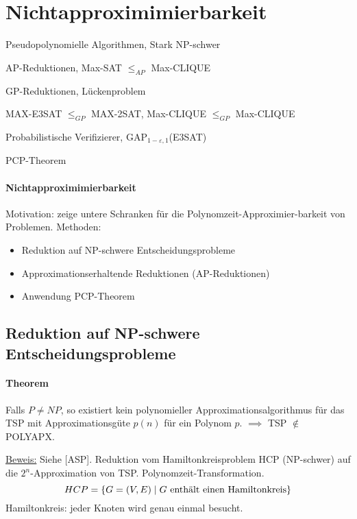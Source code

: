 \section{Nichtapproximimierbarkeit}

\begin{takeaway}
    \item Pseudopolynomielle Algorithmen, Stark NP-schwer
    \item AP-Reduktionen, Max-SAT $\leq_{AP}$ Max-CLIQUE
    \item GP-Reduktionen, Lückenproblem
    \item MAX-E3SAT $\leq_{GP}$ MAX-2SAT, Max-CLIQUE $\leq_{GP}$ Max-CLIQUE
    \item Probabilistische Verifizierer, GAP$_{1-\varepsilon, 1}$(E3SAT)
    \item PCP-Theorem
\end{takeaway}

\paragraph{Nichtapproximimierbarkeit}
Motivation: zeige untere Schranken für die Polynomzeit-Approximier-barkeit von Problemen.
Methoden:
\begin{itemize}
    \item Reduktion auf NP-schwere Entscheidungsprobleme
    \item Approximationserhaltende Reduktionen (AP-Reduktionen)
    \item Anwendung PCP-Theorem
\end{itemize}


\subsection{Reduktion auf NP-schwere Entscheidungsprobleme}

\paragraph{Theorem}
Falls $P \neq NP$, so existiert kein polynomieller Approximationsalgorithmus für das TSP
mit Approximationsgüte $p(n)$ für ein Polynom $p$.
$\implies$ TSP $\notin$ POLYAPX.

\underline{Beweis:}
Siehe [ASP]. Reduktion vom Hamiltonkreisproblem HCP (NP-schwer) auf die $2^n$-Approximation von TSP.
Polynomzeit-Transformation.
$$ HCP = \{ G=(V,E) \; | \; G \text{ enthält einen Hamiltonkreis} \} $$
Hamiltonkreis: jeder Knoten wird genau einmal besucht.

